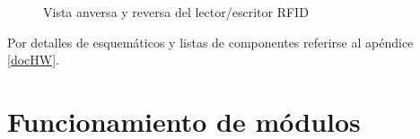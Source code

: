 \begin{figure}[H]
  \centering

  \caption{Vista anversa y reversa del lector/escritor RFID}\label{l/eRFID}
\end{figure}

\bigskip
\bigskip
Por detalles de esquemáticos y listas de componentes referirse al apéndice \ref{docHW}.

\newpage
\section{Funcionamiento de m\'odulos}

